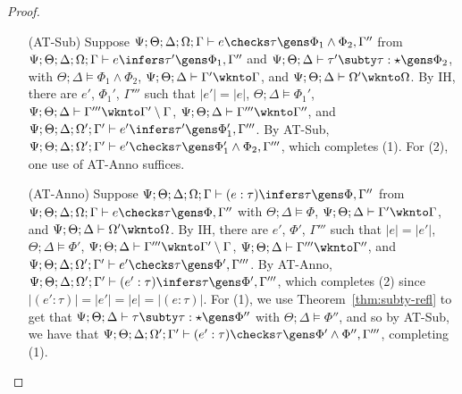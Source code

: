 \begin{proof}
\begin{itemize}
  \item[(AT-Sub)] Suppose $\Psi ; \Theta ; \Delta ; \Omega ; \Gamma \vdash e \checks \tau \gens \Phi_1 \wedge \Phi_2,\Gamma''$ from
  $\Psi ; \Theta ; \Delta ; \Omega ; \Gamma \vdash e \infers \tau' \gens \Phi_1,\Gamma''$ and
  $\Psi;\Theta;\Delta \vdash \tau' \subty \tau : \star \gens \Phi_2$, with
  $\Theta ; \Delta \vDash \Phi_1 \wedge \Phi_2$,
  $\Psi ; \Theta ; \Delta \vdash \Gamma' \wknto \Gamma$, and
  $\Psi ; \Theta ; \Delta \vdash \Omega' \wknto \Omega$.
  By IH, there are $e'$, $\Phi_1'$, $\Gamma'''$ such that
  $|e'| = |e|$,
  $\Theta ; \Delta \vDash \Phi_1'$,
  $\Psi ; \Theta ; \Delta \vdash \Gamma''' \wknto \Gamma' \setminus \Gamma$,
  $\Psi ; \Theta ; \Delta \vdash \Gamma''' \wknto \Gamma''$, and
  $\Psi ; \Theta ; \Delta ; \Omega' ; \Gamma' \vdash e' \infers \tau' \gens \Phi_1', \Gamma'''$.
  By AT-Sub, $\Psi ; \Theta ; \Delta ; \Omega' ; \Gamma' \vdash e' \checks \tau \gens \Phi_1' \wedge \Phi_2,\Gamma'''$,
  which completes (1). For (2), one use of AT-Anno suffices.
  
  \item[(AT-Anno)] Suppose $\Psi ; \Theta ; \Delta ; \Omega ; \Gamma \vdash (e : \tau) \infers \tau \gens \Phi,\Gamma''$ from 
  $\Psi ; \Theta ; \Delta ; \Omega ; \Gamma \vdash e \checks \tau \gens \Phi,\Gamma''$ with
  $\Theta ; \Delta \vDash \Phi$,
  $\Psi ; \Theta ; \Delta \vdash \Gamma' \wknto \Gamma$, and
  $\Psi ; \Theta ; \Delta \vdash \Omega' \wknto \Omega$.
  By IH, there are $e'$, $\Phi'$, $\Gamma'''$ such that
  $|e| = |e'|$,
  $\Theta ; \Delta \vDash \Phi'$,
  $\Psi ; \Theta ; \Delta \vdash \Gamma''' \wknto \Gamma' \setminus \Gamma$,
  $\Psi ; \Theta ; \Delta \vdash \Gamma''' \wknto \Gamma''$, and
  $\Psi ; \Theta ; \Delta ; \Omega' ; \Gamma' \vdash e' \checks \tau \gens \Phi',\Gamma'''$.
  By AT-Anno, $\Psi ; \Theta ; \Delta ; \Omega' ; \Gamma' \vdash (e' : \tau) \infers \tau \gens \Phi',\Gamma'''$, which completes (2)
  since $|(e' : \tau)| = |e'| = |e| = |(e : \tau)|$. For (1), we use Theorem~\ref{thm:subty-refl} to get that $\Psi ; \Theta ; \Delta \vdash \tau \subty  \tau : \star \gens \Phi''$ with $\Theta ; \Delta \vDash \Phi''$, and so by AT-Sub, we have that $\Psi ; \Theta ; \Delta ; \Omega' ; \Gamma' \vdash (e' : \tau) \checks \tau \gens \Phi' \wedge \Phi'',\Gamma'''$, completing (1).
 
  
  
\end{itemize}
\end{proof}
